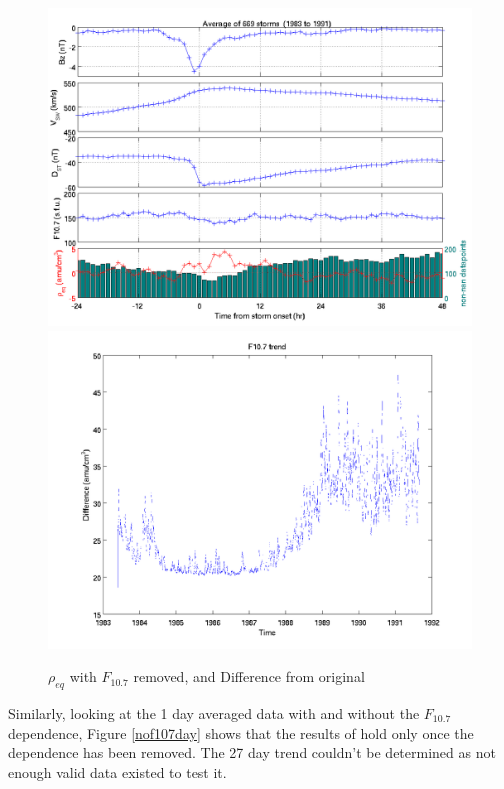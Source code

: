 \documentclass[10pt,twocolumn]{article}
\begin{document}
\begin{figure}[htp!]
\centering
\includegraphics[scale=0.35]{paperfigures/stormavs-dst-nof107.png}
\includegraphics[scale=0.35]{paperfigures/f107removed.png}
\caption{$\rho_{eq}$ with $F_{10.7}$ removed, and Difference from original}
\label{nof107}
\end{figure}

Similarly, looking at the 1 day averaged data with and without the $F_{10.7}$ dependence, Figure \ref{nof107day} shows that the results of \cite{Takahashi2010} hold only once the dependence has been removed. The 27 day trend couldn't be determined as not enough valid data existed to test it.
\end{document}
